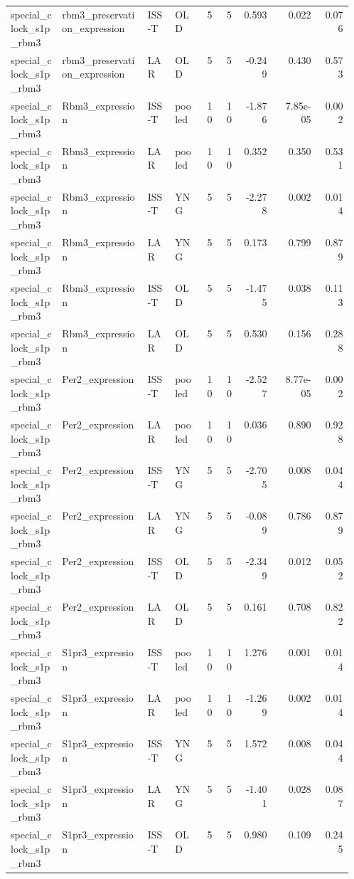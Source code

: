\documentclass[11pt]{article}
\begin{document}
\begin{landscape}
\begin{longtable}{p{0.15\linewidth}p{0.25\linewidth}p{0.08\linewidth}p{0.08\linewidth}rrrrr}
special\_clock\_s1p\_rbm3 & rbm3\_preservation\_expression & ISS-T & OLD & 5 & 5 & 0.593 & 0.022 & 0.076 \\
special\_clock\_s1p\_rbm3 & rbm3\_preservation\_expression & LAR & OLD & 5 & 5 & -0.249 & 0.430 & 0.573 \\
special\_clock\_s1p\_rbm3 & Rbm3\_expression & ISS-T & pooled & 10 & 10 & -1.876 & 7.85e-05 & 0.002 \\
special\_clock\_s1p\_rbm3 & Rbm3\_expression & LAR & pooled & 10 & 10 & 0.352 & 0.350 & 0.531 \\
special\_clock\_s1p\_rbm3 & Rbm3\_expression & ISS-T & YNG & 5 & 5 & -2.278 & 0.002 & 0.014 \\
special\_clock\_s1p\_rbm3 & Rbm3\_expression & LAR & YNG & 5 & 5 & 0.173 & 0.799 & 0.879 \\
special\_clock\_s1p\_rbm3 & Rbm3\_expression & ISS-T & OLD & 5 & 5 & -1.475 & 0.038 & 0.113 \\
special\_clock\_s1p\_rbm3 & Rbm3\_expression & LAR & OLD & 5 & 5 & 0.530 & 0.156 & 0.288 \\
special\_clock\_s1p\_rbm3 & Per2\_expression & ISS-T & pooled & 10 & 10 & -2.527 & 8.77e-05 & 0.002 \\
special\_clock\_s1p\_rbm3 & Per2\_expression & LAR & pooled & 10 & 10 & 0.036 & 0.890 & 0.928 \\
special\_clock\_s1p\_rbm3 & Per2\_expression & ISS-T & YNG & 5 & 5 & -2.705 & 0.008 & 0.044 \\
special\_clock\_s1p\_rbm3 & Per2\_expression & LAR & YNG & 5 & 5 & -0.089 & 0.786 & 0.879 \\
special\_clock\_s1p\_rbm3 & Per2\_expression & ISS-T & OLD & 5 & 5 & -2.349 & 0.012 & 0.052 \\
special\_clock\_s1p\_rbm3 & Per2\_expression & LAR & OLD & 5 & 5 & 0.161 & 0.708 & 0.822 \\
special\_clock\_s1p\_rbm3 & S1pr3\_expression & ISS-T & pooled & 10 & 10 & 1.276 & 0.001 & 0.014 \\
special\_clock\_s1p\_rbm3 & S1pr3\_expression & LAR & pooled & 10 & 10 & -1.269 & 0.002 & 0.014 \\
special\_clock\_s1p\_rbm3 & S1pr3\_expression & ISS-T & YNG & 5 & 5 & 1.572 & 0.008 & 0.044 \\
special\_clock\_s1p\_rbm3 & S1pr3\_expression & LAR & YNG & 5 & 5 & -1.401 & 0.028 & 0.087 \\
special\_clock\_s1p\_rbm3 & S1pr3\_expression & ISS-T & OLD & 5 & 5 & 0.980 & 0.109 & 0.245 \\

\end{longtable}
\end{landscape}
\end{document}
